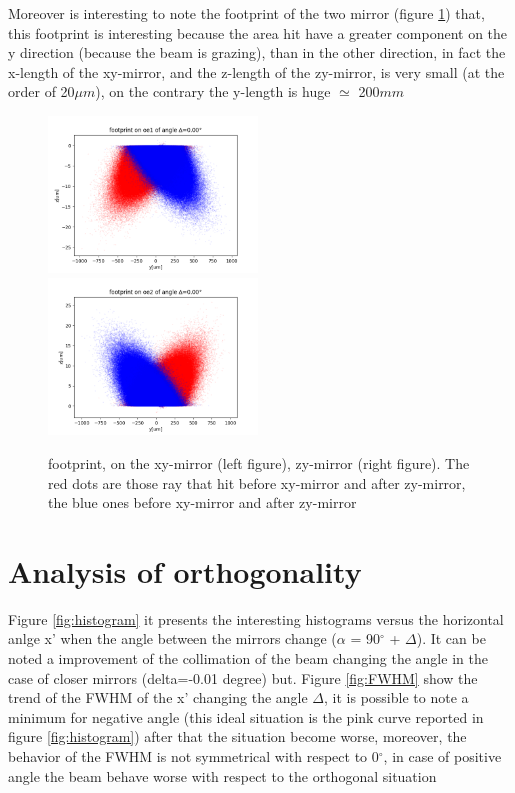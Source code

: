 \documentclass[a4paper]{article}
\begin{document}
Moreover is interesting to note the footprint of the two mirror (figure \ref{fig:footprint_oe1}) that, this footprint is interesting because the area hit have a greater component on the y direction (because the beam is grazing), than in the other direction, in fact the x-length of the xy-mirror, and the z-length of the zy-mirror, is very small (at the order of 20$\mu $$m$), on the contrary the y-length is huge $\simeq $ 200$mm$

\begin{figure}[H]
\centering
\includegraphics[width=0.495\textwidth]{footprint_oe1.png}
\includegraphics[width=0.495\textwidth]{footprint_oe2.png}
\caption{\label{fig:footprint_oe1} footprint, on the xy-mirror (left figure), zy-mirror (right figure). The red dots are those ray that hit before xy-mirror and after zy-mirror, the blue ones before xy-mirror and after zy-mirror}
\end{figure}



\section{Analysis of orthogonality}
Figure \ref{fig:histogram} it presents the interesting histograms versus the horizontal anlge x' when the angle between the mirrors change ($\alpha $ = 90$^\circ$ + $\Delta$). It can be noted a improvement of the collimation of the beam changing the angle in the case of closer mirrors (delta=-0.01 degree) but.
\newline Figure \ref{fig:FWHM} show the trend of the FWHM of the x' changing the angle $\Delta$, it is possible to note a minimum for negative angle (this ideal situation is the pink curve reported in figure \ref{fig:histogram}) after that the situation become worse, moreover, the behavior of the FWHM is not symmetrical with respect to 0$^\circ$, in case of positive angle the beam behave worse with respect to the orthogonal situation
\end{document}
